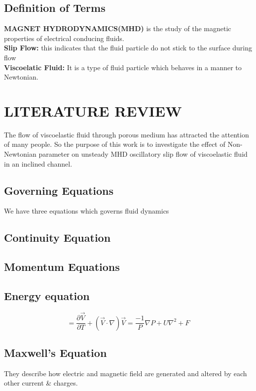 \documentclass[12pt]{report}
\newcommand{\bt}[1]{\textbf{#1}}
\newcommand{\sps}{\\[0.2cm]}
\begin{document}
	\section{Definition of Terms}
	\bt{MAGNET HYDRODYNAMICS(MHD)} is the study of the magnetic properties of electrical conducing fluids.\sps
	\bt{Slip Flow:} this indicates that the fluid particle do not stick to the surface during flow\sps
	\bt{Viscoelatic Fluid:} It is a type of fluid particle which behaves in a manner to Newtonian.


	\chapter{LITERATURE REVIEW}
	The flow of viscoelastic fluid through porous medium has attracted the attention of many people. So the purpose of this work is to investigate the effect of Non-Newtonian parameter on unsteady MHD oscillatory slip flow of viscoelastic fluid in an inclined channel.
	
	\section{Governing Equations}
	We have three equations which governs fluid dynamics
	
	\section{Continuity Equation}
	\section{Momentum Equations}
	\section{Energy equation}
	\begin{equation}
		= \frac{\partial \vec{V}}{\partial T} + (\vec{V} \cdot \nabla)\vec{V} = \frac{-1}{P}\nabla P + U\nabla^2 + F
	\end{equation}
	
	\section{Maxwell's Equation}
	They describe how electric and magnetic field are generated and altered by each other current \& charges.
	
\end{document}
